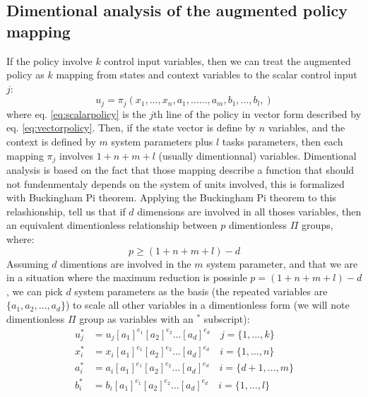 \subsection{Dimentional analysis of the augmented policy mapping}

If the policy involve $k$ control input variables, then we can treat the augmented policy as $k$ mapping from states and context variables to the scalar control input $j$:
\begin{equation}
u_j = \pi_j \left(
x_1, \hdots, x_n, 
a_1, \hdots \hdots, a_m, 
b_1, \hdots, b_l, 
\right) 
\label{eq:scalarpolicy}
\end{equation}
where eq. \eqref{eq:scalarpolicy} is the $j$th line of the policy in vector form described by eq. \eqref{eq:vectorpolicy}.
Then, if the state vector is define by $n$ variables, and the context is defined by $m$ system parameters plus $l$ tasks parameters, then each mapping $\pi_j$ involves $1 + n + m + l$ (usually dimentionnal) variables. Dimentional analysis is based on the fact that those mapping describe a function that should not fundenmentaly depends on the system of units involved, this is formalized with Buckingham Pi theorem. Applying the Buckingham Pi theorem to this relashionship, tell us that if $d$ dimensions are involved in all thoses variables, then an equivalent dimentionless relationship between $p$ dimentionless $\Pi$ groups, where:
\begin{equation}
p \geq (1 + n + m + l ) - d
\end{equation}
Assuming $d$ dimentions are involved in the $m$ system parameter, and that we are in a situation where the maximum reduction is possinle $p = (1 + n + m + l ) - d$, we can pick $d$ system parameters as the basis (the repeated variables are $\{a_1, a_2 , \hdots, a_d\}$) to scale all other variables in a dimentionless form (we will note dimentionless $\Pi$ group as variables with an ${}^*$ subscript):
\begin{align}
u_j^* &= u_j \left[ a_1 \right]^{e_1} \left[ a_2 \right]^{e_2} \hdots \left[ a_d \right]^{e_d} \quad  j = \{ 1, \hdots , k \} \\
x_i^* &= x_i \left[ a_1 \right]^{e_1} \left[ a_2\right]^{e_2} \hdots \left[ a_d \right]^{e_d} \quad  i = \{ 1, \hdots , n \} \\
a_i^* &= a_i \left[ a_1 \right]^{e_1} \left[ a_2 \right]^{e_2} \hdots \left[ a_d \right]^{e_d} \quad  i = \{ d+1, \hdots , m \} \\
b_i^* &= b_i \left[ a_1 \right]^{e_1} \left[ a_2 \right]^{e_2} \hdots \left[ a_d \right]^{e_d} \quad  i = \{ 1, \hdots , l \} 
\end{align}
